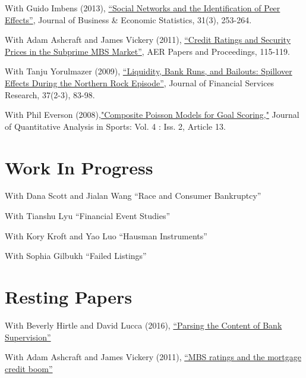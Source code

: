 \documentclass[letterpaper]{article}
\renewenvironment{itemize}{
  \begin{list}{}
    { \setlength{\itemsep}{5pt}
      \setlength{\parsep}{0pt}
      \setlength{\topsep}{0pt}
      \setlength{\leftmargin}{0em} } }{
  \end{list}}
\begin{document}
\begin{itemize}
\item With Guido Imbens (2013), \href{http://www.tandfonline.com/doi/pdf/10.1080/07350015.2013.801251}{``Social Networks and the Identification of Peer Effects''}, Journal of Business \& Economic Statistics, 31(3), 253-264.
\item With Adam Ashcraft and James Vickery (2011), \href{http://papers.ssrn.com.ezp-prod1.hul.harvard.edu/sol3/papers.cfm?abstract_id=1856823}{``Credit Ratings
    and Security Prices in the Subprime MBS Market''}, AER Papers and Proceedings,  115-119. 
\item With Tanju Yorulmazer (2009), \href{http://www.springerlink.com/content/ww187761jgr660q5/}{``Liquidity, Bank Runs, and Bailouts: Spillover Effects During the Northern Rock Episode''}, Journal of Financial Services Research, 37(2-3), 83-98. 
\item With Phil Everson (2008),\href{http://www.bepress.com/jqas/vol4/iss2/13/}{"Composite Poisson Models for Goal Scoring,"} Journal of Quantitative Analysis in Sports: Vol. 4 : Iss. 2, Article 13.
\end{itemize}


\section*{Work In Progress}
\begin{itemize}
\item With Dana Scott and Jialan Wang ``Race and Consumer Bankruptcy''
\item With Tianshu Lyu ``Financial Event Studies''
\item With Kory Kroft and Yao Luo ``Hausman Instruments''
\item With Sophia Gilbukh ``Failed Listings''
\end{itemize}

\section*{Resting Papers}
\begin{itemize}
\item With Beverly Hirtle and David Lucca (2016), \href{https://www.newyorkfed.org/research/staff_reports/sr770.html}{``Parsing the Content of Bank Supervision''}
\item With Adam Ashcraft and James Vickery (2011), \href{http://papers.ssrn.com/sol3/papers.cfm?abstract_id=1615613}{``MBS ratings and the mortgage credit boom''}
\end{itemize}
\end{document}
